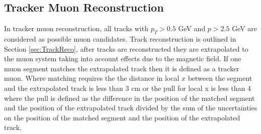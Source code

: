 \subsection{Tracker Muon Reconstruction}
In tracker muon reconstruction, all tracks with $p_{T}>0.5$ GeV
and $p>2.5$ GeV are considered as possible muon candidates. 
Track reconstruction is outlined in Section \ref{sec:TrackReco},
after tracks are reconstructed they are extrapolated to the muon
system taking into account effects due to the magnetic field.
If one muon segment matches the extrapolated track then 
it is defined as a tracker muon.  Where matching requires
the the distance in local $x$ between the segment and the extrapolated
track is less than 3 cm or the pull for local x is less than 4 where
the pull is defined as the difference in the position of the matched segment
and the position of the extrapolated track divided by the sum of 
the uncertainties on the position of the matched segment
and the position of the extrapolated track.
